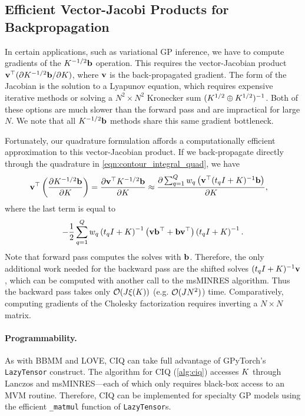 \subsection{Efficient Vector-Jacobi Products for Backpropagation}

In certain applications, such as variational GP inference, we have to compute gradients of the $K^{-1/2} \mathbf{b}$ operation.
This requires the vector-Jacobian product $\mathbf{v}^\top ( \partial K^{-1/2} \mathbf{b} / \partial K)$, where $\mathbf{v}$ is the back-propagated gradient.
The form of the Jacobian is the solution to a Lyapunov equation, which requires expensive iterative methods or solving a $N^2 \times N^2$ Kronecker sum $(K^{1/2} \oplus K^{1/2})^{-1}$.
Both of these options are much slower than the forward pass and are impractical for large $N$.
We note that all $K^{-1/2} \mathbf{b}$ methods share this same gradient bottleneck.

Fortunately, our quadrature formulation affords a computationally efficient approximation to this vector-Jacobian product.
If we back-propagate directly through the quadrature in \cref{eqn:contour_integral_quad}, we have
%
\begin{align}
  \mathbf{v}^\top \left( \frac{ \partial K^{-1/2} \mathbf{b} }{ \partial K } \right)
  = \frac{ \partial \mathbf{v}^\top K^{-1/2} \mathbf{b} }{ \partial K }
  &\approx \frac{ \partial \sum_{q=1}^{Q} w_q \left( \mathbf{v}^\top (t_q I + K)^{-1} \mathbf{b} \right) }{ \partial K },
  \label{eqn:ciq_deriv}
\end{align}
%
where the last term is equal to
\[- \frac{1}{2} \sum_{q=1}^{Q} w_q \left( t_q I + K \right)^{-1} \left( \mathbf{v} \mathbf{b}^\top + \mathbf{b} \mathbf{v}^\top \right) \left( t_q I + K \right)^{-1}.\]
Note that forward pass computes the solves with $\mathbf{b}$.
Therefore, the only additional work needed for the backward pass are the shifted solves $(t_q I + K)^{-1} \mathbf{v}$, which can be computed with another call to the msMINRES algorithm.
Thus the backward pass takes only $\bigo{J \mvm{\bK}}$ (e.g. $\bigo{J N^2}$) time.
Comparatively, computing gradients of the Cholesky factorization requires inverting a $N \times N$ matrix.

\paragraph{Programmability.}
As with BBMM and LOVE, CIQ can take full advantage of GPyTorch's {\tt LazyTensor} construct.
The algorithm for CIQ (\cref{alg:ciq}) accesses $K$ through Lanczos and msMINRES---each of which only requires black-box access to an MVM routine.
Therefore, CIQ can be implemented for specialty GP models using the efficient {\tt \_matmul} function of {\tt LazyTensor}s.

